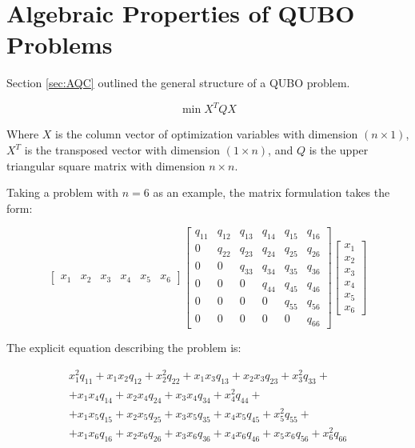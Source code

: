 \section{Algebraic Properties of QUBO Problems}\label{sec:prop}

Section \ref{sec:AQC} outlined the general structure of a QUBO problem. 

$$\min X^TQX$$ 

Where $X$ is the column vector of optimization variables with dimension $(n \times 1)$, $X^T$ is the transposed vector with dimension $(1 \times n)$, and $Q$ is the upper triangular square matrix with dimension $n \times n$.

Taking a problem with $n=6$ as an example, the matrix formulation takes the form:

\begin{equation}
    \begin{bmatrix}
        x_1 & x_2 & x_3 & x_4 & x_5 & x_6
    \end{bmatrix}
    \begin{bmatrix}
        q_{11} & q_{12} & q_{13} & q_{14} & q_{15} & q_{16} \\
        0 & q_{22} & q_{23} & q_{24} & q_{25} & q_{26} \\
        0 & 0 & q_{33} & q_{34} & q_{35} & q_{36} \\
        0 & 0 & 0 & q_{44} & q_{45} & q_{46} \\
        0 & 0 & 0 & 0 & q_{55} & q_{56} \\
        0 & 0 & 0 & 0 & 0 & q_{66}
    \end{bmatrix}
    \begin{bmatrix}
        x_1 \\
        x_2 \\
        x_3 \\
        x_4 \\
        x_5 \\
        x_6
    \end{bmatrix}
\end{equation}

The explicit equation describing the problem is:

\begin{multline}
    x_1^2q_{11} + x_1x_2q_{12} + x_2^2q_{22} + x_1x_3q_{13} + x_2x_3q_{23} + x_3^2q_{33} + \\ 
    + x_1x_4q_{14} + x_2x_4q_{24} + x_3x_4q_{34} + x_4^2q_{44} + \\ 
    + x_1x_5q_{15} + x_2x_5q_{25} + x_3x_5q_{35} + x_4x_5q_{45} + x_5^2q_{55} + \\ 
    + x_1x_6q_{16} + x_2x_6q_{26} + x_3x_6q_{36} + x_4x_6q_{46} + x_5x_6q_{56} + x_6^2q_{66}
    \label{eq:whole6}
\end{multline}

